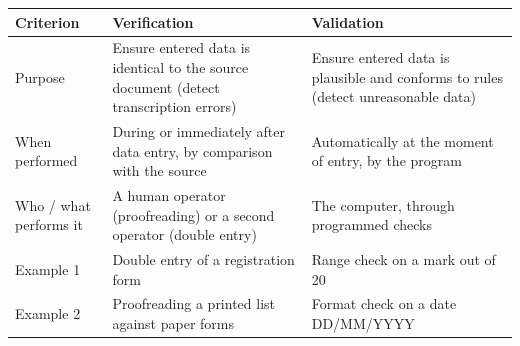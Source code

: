 \documentclass[11pt]{article}
\begin{document}
\begin{corrige}
\begin{center}
\begin{tabularx}{\linewidth}{|l|X|X|}
\hline
\rowcolor{popblueL} \textbf{Criterion} & \textbf{Verification} & \textbf{Validation} \\
\hline
Purpose & Ensure entered data is identical to the source document (detect transcription errors) & Ensure entered data is plausible and conforms to rules (detect unreasonable data) \\
\hline
When performed & During or immediately after data entry, by comparison with the source & Automatically at the moment of entry, by the program \\
\hline
Who / what performs it & A human operator (proofreading) or a second operator (double entry) & The computer, through programmed checks \\
\hline
Example 1 & Double entry of a registration form & Range check on a mark out of 20 \\
\hline
Example 2 & Proofreading a printed list against paper forms & Format check on a date DD/MM/YYYY \\
\hline
\end{tabularx}
\end{center}
\end{corrige}
\end{document}
